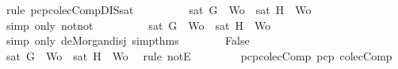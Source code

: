 \begin{isabellebody}
\ {\isacharparenleft}rule\ pcp{\isacharunderscore}colecComp{\isacharunderscore}DIS{\isacharunderscore}sat{\isacharparenright}\isanewline
\ \ \ \ \ \ \isamarkupfalse%
\ \isamarkupfalse%
\ {\isachardoublequoteopen}{\isasymnot}{\isasymnot}{\isacharparenleft}sat\ {\isacharparenleft}{\isacharbraceleft}G{\isacharbraceright}\ {\isasymunion}\ {\isacharquery}Wo{\isacharparenright}\ {\isasymor}\ sat\ {\isacharparenleft}{\isacharbraceleft}H{\isacharbraceright}\ {\isasymunion}\ {\isacharquery}Wo{\isacharparenright}{\isacharparenright}{\isachardoublequoteclose}\isanewline
\ \ \ \ \ \ \ \ \isamarkupfalse%
\ {\isacharparenleft}simp\ only{\isacharcolon}\ not{\isacharunderscore}not{\isacharparenright}\isanewline
\ \ \ \ \ \ \isamarkupfalse%
\ \isamarkupfalse%
\ {\isachardoublequoteopen}{\isasymnot}{\isacharparenleft}{\isasymnot}{\isacharparenleft}sat\ {\isacharparenleft}{\isacharbraceleft}G{\isacharbraceright}\ {\isasymunion}\ {\isacharquery}Wo{\isacharparenright}{\isacharparenright}\ {\isasymand}\ {\isasymnot}{\isacharparenleft}sat\ {\isacharparenleft}{\isacharbraceleft}H{\isacharbraceright}\ {\isasymunion}\ {\isacharquery}Wo{\isacharparenright}{\isacharparenright}{\isacharparenright}{\isachardoublequoteclose}\isanewline
\ \ \ \ \ \ \ \ \isamarkupfalse%
\ {\isacharparenleft}simp\ only{\isacharcolon}\ de{\isacharunderscore}Morgan{\isacharunderscore}disj\ simp{\isacharunderscore}thms{\isacharparenleft}{}{\isacharparenright}{\isacharparenright}\isanewline
\ \ \ \ \ \ \isamarkupfalse%
\ {\isachardoublequoteopen}False{\isachardoublequoteclose}\isanewline
\ \ \ \ \ \ \ \ \isamarkupfalse%
\ {\isacartoucheopen}{\isasymnot}{\isacharparenleft}sat\ {\isacharparenleft}{\isacharbraceleft}G{\isacharbraceright}\ {\isasymunion}\ {\isacharquery}Wo{\isacharparenright}{\isacharparenright}\ {\isasymand}\ {\isasymnot}{\isacharparenleft}sat\ {\isacharparenleft}{\isacharbraceleft}H{\isacharbraceright}\ {\isasymunion}\ {\isacharquery}Wo{\isacharparenright}{\isacharparenright}{\isacartoucheclose}\ \isamarkupfalse%
\ {\isacharparenleft}rule\ notE{\isacharparenright}\isanewline
\ \ \ \ \isamarkupfalse%
\isanewline
\ \ \isamarkupfalse%
\isanewline
{}\isamarkupfalse%
%
\endisatagproof
{\isafoldproof}%
%
\isadelimproof
\isanewline
%
\endisadelimproof
\isanewline
{}\isamarkupfalse%
\ pcp{\isacharunderscore}colecComp{\isacharcolon}\ {\isachardoublequoteopen}pcp\ colecComp{\isachardoublequoteclose}\isanewline

\end{isabellebody}
